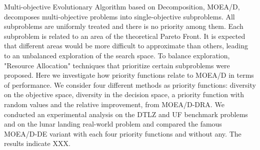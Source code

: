 Multi-objective Evolutionary Algorithm based on Decomposition, MOEA/D, decomposes multi-objective problems into single-objective subproblems. All subproblems are uniformly treated and there is no priority among them. Each subproblem is related to an area of the theoretical Pareto Front. It is expected that different areas would be more difficult to approximate than others, leading to an unbalanced exploration of the search space. To balance exploration, "Resource Allocation" techniques that prioritize certain subproblems were proposed. Here we investigate how priority functions relate to MOEA/D in terms of performance. We consider four different methods as priority functions: diversity on the objective space, diversity in the decision space, a priority function with random values and the relative improvement, from MOEA/D-DRA. We conducted an experimental analysis on the DTLZ and UF benchmark problems and on the lunar landing real-world problem and compared the famous MOEA/D-DE variant with each four priority functions and without any. The results indicate XXX.